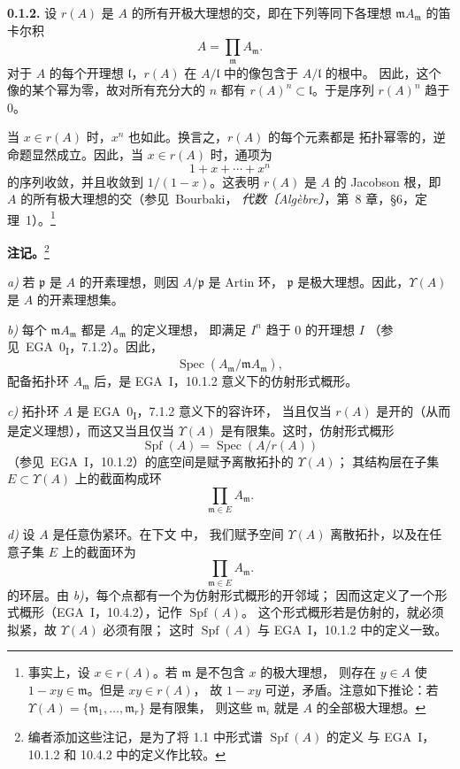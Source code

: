 \medskip
\noindent\textbf{0.1.2.}
\label{sga3:VIIB:0.1.2}
设 \(r(A)\) 是 \(A\) 的所有开极大理想的交，即在下列等同下各理想
\(\mathfrak mA_{\mathfrak m}\) 的笛卡尔积
\[
  A=\prod_{\mathfrak m}A_{\mathfrak m}.
\]
对于 \(A\) 的每个开理想 \(\mathfrak l\)，\(r(A)\) 在
\(A/\mathfrak l\) 中的像包含于 \(A/\mathfrak l\) 的根中。
因此，这个像的某个幂为零，故对所有充分大的 \(n\) 都有
\(r(A)^n\subset\mathfrak l\)。于是序列 \(r(A)^n\) 趋于 \(0\)。

当 \(x\in r(A)\) 时，\(x^n\) 也如此。换言之，\(r(A)\) 的每个元素都是
拓扑幂零的，逆命题显然成立。因此，当 \(x\in r(A)\) 时，通项为
\[
  1+x+\cdots+x^n
\]
的序列收敛，并且收敛到 \(1/(1-x)\)。这表明 \(r(A)\) 是 \(A\) 的
Jacobson 根，即 \(A\) 的所有极大理想的交（参见\ Bourbaki，
\emph{代数〔Alg\`ebre〕}，第~8 章，\S6，定理~1）。\footnote{事实上，设 \(x\in r(A)\)。若 \(\mathfrak m\) 是不包含 \(x\) 的极大理想，
则存在 \(y\in A\) 使 \(1-xy\in\mathfrak m\)。但是 \(xy\in r(A)\)，
故 \(1-xy\) 可逆，矛盾。注意如下推论：若
\(\Upsilon(A)=\{\mathfrak m_1,\ldots,\mathfrak m_r\}\) 是有限集，
则这些 \(\mathfrak m_i\) 就是 \(A\) 的全部极大理想。}

\medskip
\noindent\textbf{注记。}\footnote{编者添加这些注记，是为了将 1.1 中形式谱 \(\operatorname{Spf}(A)\) 的定义
与 EGA~I，10.1.2 和 10.4.2 中的定义作比较。}

\noindent\textit{a)} 若 \(\mathfrak p\) 是 \(A\) 的开素理想，则因 \(A/\mathfrak p\) 是 Artin 环，
\(\mathfrak p\) 是极大理想。因此，\(\Upsilon(A)\) 是 \(A\) 的开素理想集。

\smallskip
\noindent\textit{b)} 每个 \(\mathfrak mA_{\mathfrak m}\) 都是 \(A_{\mathfrak m}\) 的定义理想，
即满足 \(I^n\) 趋于 \(0\) 的开理想 \(I\)
（参见\ EGA~0\textsubscript{I}，7.1.2）。因此，
\[
  \operatorname{Spec}
    (A_{\mathfrak m}/\mathfrak mA_{\mathfrak m}),
\]
配备拓扑环 \(A_{\mathfrak m}\) 后，是 EGA~I，10.1.2 意义下的仿射形式概形。

\smallskip
\noindent\textit{c)} 拓扑环 \(A\) 是 EGA~0\textsubscript{I}，7.1.2 意义下的容许环，
当且仅当 \(r(A)\) 是开的（从而是定义理想），而这又当且仅当
\(\Upsilon(A)\) 是有限集。这时，仿射形式概形
\[
  \operatorname{Spf}(A)
  =
  \operatorname{Spec}(A/r(A))
\]
（参见\ EGA~I，10.1.2）的底空间是赋予离散拓扑的 \(\Upsilon(A)\)；
其结构层在子集 \(E\subset\Upsilon(A)\) 上的截面构成环
\[
  \prod_{\mathfrak m\in E}A_{\mathfrak m}.
\]

\smallskip
\noindent\textit{d)} 设 \(A\) 是任意伪紧环。在下文  中，
我们赋予空间 \(\Upsilon(A)\) 离散拓扑，以及在任意子集 \(E\) 上的截面环为
\[
  \prod_{\mathfrak m\in E}A_{\mathfrak m}.
\]
的环层。由 \textit{b)}，每个点都有一个为仿射形式概形的开邻域；
因而这定义了一个形式概形（EGA~I，10.4.2），记作 \(\operatorname{Spf}(A)\)。
这个形式概形若是仿射的，就必须拟紧，故 \(\Upsilon(A)\) 必须有限；
这时 \(\operatorname{Spf}(A)\) 与 EGA~I，10.1.2 中的定义一致。

